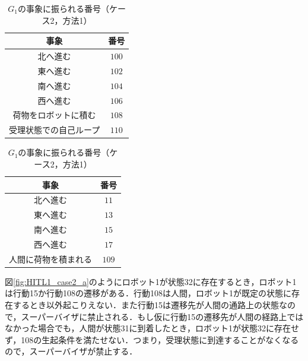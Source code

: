 \begin{table}[t]
  \begin{minipage}[t]{.45\textwidth}
    \begin{center}
      \begin{tabular}{|c|c|} \hline

         事象 & 番号 \\ \hline
         北へ進む & $100$ \\
         東へ進む & $102$ \\
         南へ進む & $104$ \\
         西へ進む & $106$ \\ 
         荷物をロボットに積む & $108$ \\ 
         受理状態での自己ループ & $110$ \\ \hline
         
      \end{tabular}
    \end{center}
    \caption{$H$の事象に振られる番号（ケース2，方法1）}
    \label{tb:event_numbers_human3}
  \end{minipage}
  \hfill
  \begin{minipage}[t]{.45\textwidth}
    \begin{center}
      \begin{tabular}{|c|c|} \hline

         事象 & 番号 \\ \hline
         北へ進む & $11$ \\
         東へ進む & $13$ \\
         南へ進む & $15$ \\
         西へ進む & $17$ \\ 
         人間に荷物を積まれる & $109$ \\ \hline

      \end{tabular}
    \end{center}
    \caption{$G_1$の事象に振られる番号（ケース2，方法1）}
    \label{tb:event_numbers_G1}
  \end{minipage}
\end{table}

図\ref{fig:HITL1_case2_a}のようにロボット1が状態32に存在するとき，ロボット1は行動15か行動108の遷移がある．行動108は人間，ロボット1が既定の状態に存在するとき以外起こりえない．また行動15は遷移先が人間の通路上の状態なので，スーパーバイザに禁止される．もし仮に行動15の遷移先が人間の経路上ではなかった場合でも，人間が状態31に到着したとき，ロボット1が状態32に存在せず，108の生起条件を満たせない．つまり，受理状態に到達することがなくなるので，スーパーバイザが禁止する．

